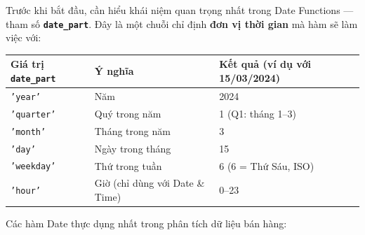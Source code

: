 \documentclass[12pt]{article}
\begin{document}
\noindent Trước khi bắt đầu, cần hiểu khái niệm quan trọng nhất trong Date Functions --- tham số \textbf{\texttt{date\_part}}. Đây là một chuỗi chỉ định \textbf{đơn vị thời gian} mà hàm sẽ làm việc với:

\begin{center}
\renewcommand{\arraystretch}{1.4}
\begin{tabularx}{\linewidth}{l l X}
\toprule
\textbf{Giá trị \texttt{date\_part}} & \textbf{Ý nghĩa} & \textbf{Kết quả (ví dụ với 15/03/2024)} \\
\midrule
\texttt{'year'} & Năm & 2024 \\
\texttt{'quarter'} & Quý trong năm & 1 (Q1: tháng 1--3) \\
\texttt{'month'} & Tháng trong năm & 3 \\
\texttt{'day'} & Ngày trong tháng & 15 \\
\texttt{'weekday'} & Thứ trong tuần & 6 (6 = Thứ Sáu, ISO) \\
\texttt{'hour'} & Giờ (chỉ dùng với Date \& Time) & 0--23 \\
\bottomrule
\end{tabularx}
\end{center}

\noindent Các hàm Date thực dụng nhất trong phân tích dữ liệu bán hàng:
\end{document}
